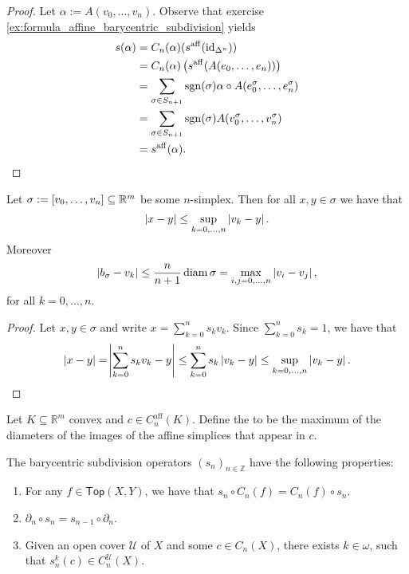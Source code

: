 \begin{proof}
	Let $\alpha := A(v_0,\dots,v_n)$. Observe that exercise \ref{ex:formula_affine_barycentric_subdivision} yields
	\begin{align*}
		s(\alpha) &= C_n(\alpha)(s^{\mathrm{aff}}(\id_{\Delta^n}))\\
		&= C_n(\alpha)\del[1]{s^{\mathrm{aff}}(A(e_0,\dots,e_n))}\\
		&= \sum_{\sigma \in S_{n + 1}} \sgn(\sigma) \alpha \circ A(e_0^\sigma,\dots,e_n^\sigma)\\
		&= \sum_{\sigma \in S_{n + 1}} \sgn(\sigma) A(v_0^\sigma,\dots,v_n^\sigma)\\
		&= s^{\mathrm{aff}}(\alpha).
	\end{align*}	
\end{proof}

\begin{lemma}
	Let $\sigma := \sbr[0]{v_0,\dots,v_n} \subseteq \mathbb{R}^m$ be some $n$-simplex. Then for all $x,y \in \sigma$ we have that
	\begin{equation*}
		\abs[0]{x - y} \leq \sup_{k = 0,\dots,n} \abs[0]{v_k - y}.
	\end{equation*}
	Moreover
	\begin{equation*}
		\abs[0]{b_\sigma - v_k} \leq \frac{n}{n + 1}\diam \sigma = \max_{i,j = 0,\dots,n}\abs[0]{v_i - v_j},
	\end{equation*}
	\noindent for all $k = 0,\dots,n$.
\end{lemma}

\begin{proof}
	Let $x,y \in \sigma$ and write $x = \sum_{k = 0}^n s_k v_k$. Since $\sum_{k = 0}^n s_k = 1$, we have that
	\begin{equation*}
		\abs[0]{x - y} = \abs[4]{\sum_{k = 0}^n s_k v_k - y} \leq \sum_{k = 0}^n s_k \abs[0]{v_k - y} \leq \sup_{k = 0,\dots,n} \abs[0]{v_k - y}.
	\end{equation*}
\end{proof}

\begin{definition}[Mesh]
	Let $K \subseteq \mathbb{R}^m$ convex and $c \in C_n^\mathrm{aff}(K)$. Define the  to be the maximum of the diameters of the images of the affine simplices that appear in $c$.
\end{definition}

\begin{proposition}
	\label{prop:properties_s_n}
	The barycentric subdivision operators $(s_n)_{n \in \mathbb{Z}}$ have the following properties:
	\begin{enumerate}[label = \textup{(}\alph*\textup{)},wide = 0pt]
		\item For any $f \in \mathsf{Top}(X,Y)$, we have that $s_n \circ C_n(f) = C_n(f) \circ s_n$.
		\item $\partial_n \circ s_n = s_{n - 1} \circ \partial_n$.
		\item Given an open cover $\mathcal{U}$ of $X$ and some $c \in C_n(X)$, there exists $k \in \omega$, such that $s_n^k(c) \in C_n^\mathcal{U}(X)$.
	\end{enumerate}
\end{proposition}

